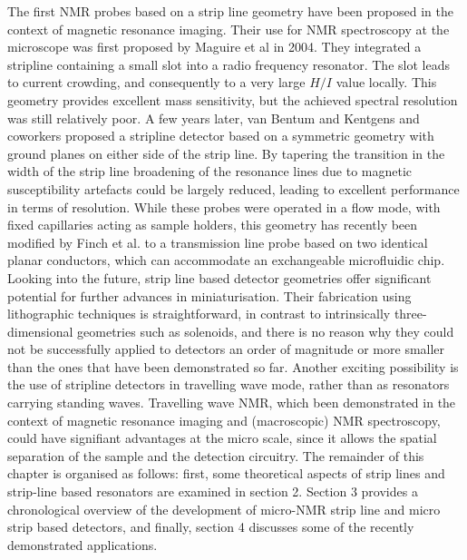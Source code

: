 The first NMR probes based on a strip line geometry have been proposed in the context of magnetic 
resonance imaging. Their use for NMR spectroscopy at the microscope was first proposed by Maguire et al 
\cite{Maguire:2009wc} in 2004. They integrated a stripline containing a small slot into a radio 
frequency resonator. The slot leads to current crowding, and consequently to a very large $H/I$ value 
locally. This geometry provides excellent mass sensitivity, but the achieved spectral resolution was 
still relatively poor. A few years later, van Bentum and Kentgens and coworkers proposed a stripline 
detector based on a symmetric geometry with ground planes on either side of the strip line. By tapering 
the transition in the width of the strip line broadening of the resonance lines due to magnetic 
susceptibility artefacts could be largely reduced, \cite{Bart:2009er} leading to excellent performance 
in terms of resolution. While these probes were operated in a flow mode, with fixed capillaries acting 
as sample holders, this geometry has recently been modified by Finch et al. to a transmission line 
probe based on two identical planar conductors, which can accommodate an exchangeable microfluidic 
chip.
Looking into the future, strip line based detector geometries offer significant potential for further 
advances in miniaturisation. Their fabrication using lithographic techniques is straightforward, in 
contrast to intrinsically three-dimensional geometries such as solenoids, and there is no reason why 
they could not be successfully applied to detectors an order of magnitude or more smaller than the ones 
that have been demonstrated so far. Another exciting possibility is the use of stripline detectors in 
travelling wave mode, rather than as resonators carrying standing waves. Travelling wave NMR, which 
been demonstrated in the context of magnetic resonance imaging and (macroscopic) NMR spectroscopy, 
could have signifiant advantages at the micro scale, since it allows the spatial separation of the 
sample and the detection circuitry. 
The remainder of this chapter is organised as follows: first, some theoretical aspects of strip lines 
and strip-line based resonators are examined in section 2. Section 3 provides a chronological overview 
of the development of micro-NMR strip line and micro strip based detectors, and finally, section 4 
discusses some of the recently demonstrated applications.